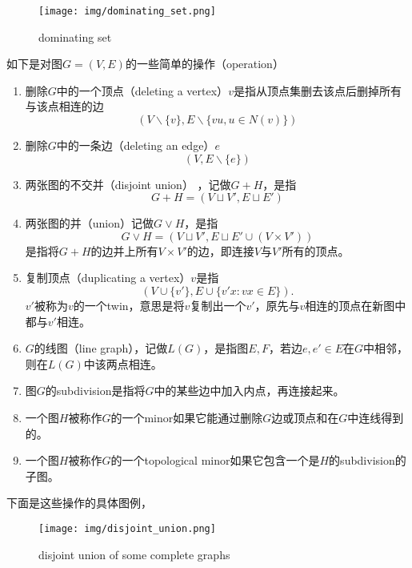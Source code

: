 \begin{figure*}[h]
	\centering
\texttt{[image: img/dominating\_set.png]}
	\caption{dominating set\label{fig:dominating set}}
\end{figure*}
\begin{definition}
	如下是对图$G=(V, E)$的一些简单的操作（operation）
	\begin{enumerate}
		\item 删除$G$中的一个顶点（deleting a vertex）$v$是指从顶点集删去该点后删掉所有与该点相连的边
		\begin{equation*}
			(V\backslash \{v\}, E\backslash \{vu, u\in N(v)\})
		\end{equation*}
		\item 删除$G$中的一条边（deleting an edge）$e$
		\begin{equation*}
			(V, E\backslash \{e\})
		\end{equation*}
		\item 两张图的不交并（disjoint union） ，记做$G+H$，是指
		\begin{equation*}
			G+H = (V\sqcup V', E\sqcup E')
		\end{equation*}
		\item 两张图的并（union）记做$G\vee H$，是指
		\begin{equation*}
			G\vee H = (V\sqcup V', E\sqcup E'\cup (V\times V'))
		\end{equation*}
		是指将$G+H$的边并上所有$V\times V'$的边，即连接$V$与$V'$所有的顶点。
		\item 复制顶点（duplicating a vertex）$v$是指
		\begin{equation*}
			(V\cup\{v'\}, E\cup\{v'x:vx\in E\}).
		\end{equation*}
		$v'$被称为$v$的一个twin，意思是将$v$复制出一个$v'$，原先与$v$相连的顶点在新图中都与$v'$相连。
		\item $G$的线图（line graph），记做$L(G)$，是指图$E, F$，若边$e, e'\in E$在$G$中相邻，则在$L(G)$中该两点相连。
		\item 图$G$的subdivision是指将$G$中的某些边中加入内点，再连接起来。
		\item 一个图$H$被称作$G$的一个minor如果它能通过删除$G$边或顶点和在$G$中连线得到的。
		\item 一个图$H$被称作$G$的一个topological minor如果它包含一个是$H$的subdivision的子图。
	\end{enumerate}
\end{definition}
下面是这些操作的具体图例，
\begin{figure*}[htb]
	\centering
\texttt{[image: img/disjoint\_union.png]}
	\caption{disjoint union of some complete graphs\label{fig:disjoint union}}
\end{figure*}
